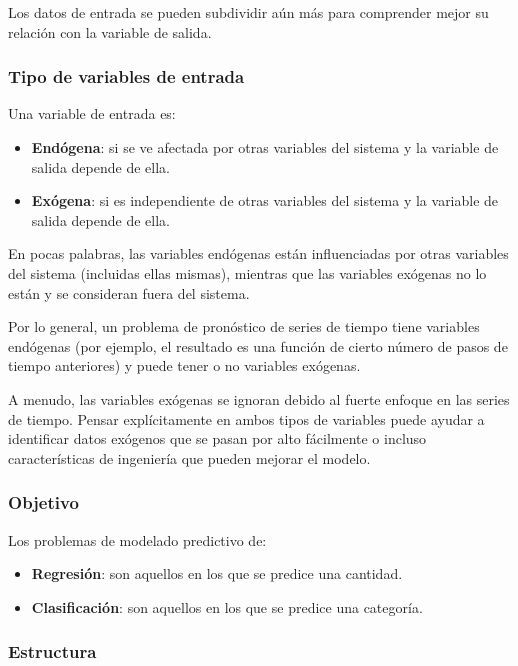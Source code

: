 \documentclass[a4paper,12pt]{article}
\begin{document}
Los datos de entrada se pueden subdividir aún más para comprender mejor su relación con la variable de salida.

\subsubsection{Tipo de variables de entrada}

Una variable de entrada es:
\begin{itemize}[noitemsep, topsep=2pt]
	\item \textbf{Endógena}: si se ve afectada por otras variables del sistema y la variable de salida depende de ella.
	\item \textbf{Exógena}: si es independiente de otras variables del sistema y la variable de salida depende de ella.
\end{itemize}

En pocas palabras, las variables endógenas están influenciadas por otras variables del sistema (incluidas ellas mismas), mientras que las variables exógenas no lo están y se consideran fuera del sistema.

Por lo general, un problema de pronóstico de series de tiempo tiene variables endógenas (por ejemplo, el resultado es una función de cierto número de pasos de tiempo anteriores) y puede tener o no variables exógenas.

A menudo, las variables exógenas se ignoran debido al fuerte enfoque en las series de tiempo. Pensar explícitamente en ambos tipos de variables puede ayudar a identificar datos exógenos que se pasan por alto fácilmente o incluso características de ingeniería que pueden mejorar el modelo.

\subsubsection{Objetivo}

Los problemas de modelado predictivo de:

\begin{itemize}[noitemsep, topsep=2pt]
	\item \textbf{Regresión}: son aquellos en los que se predice una cantidad.
	\item  \textbf{Clasificación}: son aquellos en los que se predice una categoría.
\end{itemize}

\subsubsection{Estructura}
\end{document}
